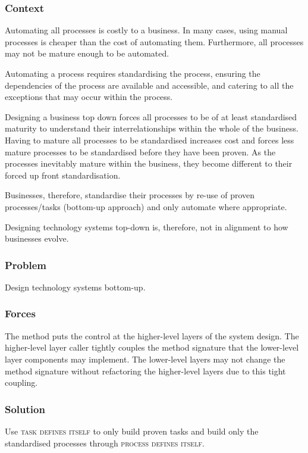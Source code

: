 \documentclass[prodmode]{style/acmlarge}
\begin{document}
\subsubsection*{Context} Automating all processes is costly to a business.  In
many cases, using manual processes is cheaper than the cost of automating them.
 Furthermore, all processes may not be mature enough to be automated.
 
Automating a process requires standardising the process, ensuring the
dependencies of the process are available and accessible, and catering to all the
exceptions that may occur within the process.

Designing a business top down forces all processes to be of at least
standardised maturity to understand their interrelationships within the whole of
the business.  Having to mature all processes to be standardised increases cost
and forces less mature processes to be standardised before they have been
proven.  As the processes inevitably mature within the business, they become
different to their forced up front standardisation.

Businesses, therefore, standardise their processes by re-use of proven
processes/tasks (bottom-up approach) and only automate where appropriate.

Designing technology systems top-down is, therefore, not in alignment to how
businesses evolve.

\subsubsection*{Problem} Design technology systems bottom-up.

\subsubsection*{Forces} The method puts the control at the higher-level layers
of the system design.  The higher-level layer caller tightly couples the method
signature that the lower-level layer components may implement.  The lower-level
layers may not change the method signature without refactoring the higher-level
layers due to this tight coupling.

\subsubsection*{Solution} Use \textsc{task defines itself} to only build proven
tasks and build only the standardised processes through \textsc{process defines
itself}.
\end{document}
